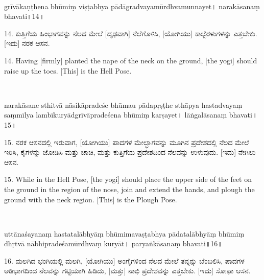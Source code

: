 ~\vskip 1cm

\dummyimage
\begin{sans}
grīvākaṇṭhena\endnote{°kaṇṭhena~] P, °kaṃṭhakena M.} bhūmiṃ viṣṭabhya pādāgradvayamūrdhvamunnayet। narakāsanaṃ bhavati॥14॥
\end{sans}
\bigskip

\begin{kan}
14.	ಕುತ್ತಿಗೆಯ ಹಿಂಭಾಗವನ್ನು ನೆಲದ ಮೇಲೆ [ದೃಢವಾಗಿ] ನೆಲೆಗೊಳಿಸಿ, [ಯೋಗಿಯು] ಕಾಲ್ಬೆರಳುಗಳನ್ನು ಎತ್ತಬೇಕು. [ಇದು] ನರಕ ಆಸನ.
\end{kan}
\bigskip

\begin{eng}
14. Having [firmly]  planted the nape of the neck on the ground, [the yogi] should raise up the toes. [This] is the Hell Pose.
\end{eng}
\newpage

~\vskip 1cm

\dummyimage
\begin{sans}
narakāsane sthitvā nāsikāpradeśe bhūmau pādapṛṣṭhe sthāpya hastadvayaṃ saṃmīlya lambīkuryādgrīvāpradeśena bhūmiṃ karṣayet। lāṅgalāsanaṃ bhavati॥15॥
\end{sans}
\bigskip

\begin{kan}
15.	ನರಕ ಆಸನದಲ್ಲಿ ಇರುವಾಗ, [ಯೋಗಿಯು] ಪಾದಗಳ ಮೇಲ್ಭಾಗವನ್ನು ಮೂಗಿನ ಪ್ರದೇಶದಲ್ಲಿ ನೆಲದ ಮೇಲೆ ಇರಿಸಿ, ಕೈಗಳನ್ನು ಜೋಡಿಸಿ ಮತ್ತು ಚಾಚಿ, ಮತ್ತು ಕುತ್ತಿಗೆಯ ಪ್ರದೇಶದಿಂದ ನೆಲವನ್ನು ಉಳುವುದು. [ಇದು] ನೇಗಿಲು ಆಸನ.
\end{kan}
\bigskip

\begin{eng}
15. While in the Hell Pose, [the yogi] should place the upper side of the feet on the ground in the region of the nose, join and extend the hands, and plough the ground with the neck region. [This] is the Plough Pose.
\end{eng}
\newpage

~\vskip 1cm

\dummyimage
\begin{sans}
uttānaśayanaṃ hastatalābhyāṃ bhūmimavaṣṭabhya pādatalābhyāṃ bhūmiṃ dhṛtvā nābhipradeśamūrdhvaṃ kuryāt। paryaṅkāsanaṃ bhavati॥16॥
\end{sans}
\bigskip

\begin{kan}
16.	ಮಲಗಿದ ಭಂಗಿಯಲ್ಲಿ ಮಲಗಿ, [ಯೋಗಿಯು] ಅಂಗೈಗಳಿಂದ ನೆಲದ ಮೇಲೆ ತನ್ನನ್ನು ಬೆಂಬಲಿಸಿ, ಪಾದಗಳ ಅಡಿಭಾಗದಿಂದ ನೆಲವನ್ನು ಗಟ್ಟಿಯಾಗಿ ಹಿಡಿದು, [ಮತ್ತು] ನಾಭಿ ಪ್ರದೇಶವನ್ನು ಎತ್ತಬೇಕು. [ಇದು] ಸೋಫಾ ಆಸನ.
\end{kan}
\bigskip

